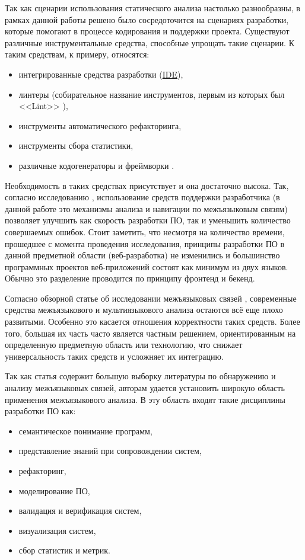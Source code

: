 Так как сценарии использования статического анализа настолько разнообразны, в рамках данной работы
решено было сосредоточится на сценариях разработки, которые помогают в процессе кодирования и поддержки проекта.
Существуют различные инструментальные средства, способные упрощать такие сценарии.
К таким средствам, к примеру, относятся:
\begin{itemize}
    \item интегрированные средства разработки (\hyperlink{IDE}{IDE}),
    \item линтеры (собирательное название инструментов, первым из которых был <<Lint>> \cite{linter}),
    \item инструменты автоматического рефакторинга,
    \item инструменты сбора статистики,
    \item различные кодогенераторы и фреймворки \cite{qt-moc}\cite{react}.
\end{itemize}

Необходимость в таких средствах присутствует и она достаточно высока. Так, согласно
исследованию \cite{aid-developers}, использование средств поддержки разработчика
(в данной работе это механизмы анализа и навигации по межъязыковым связям) позволяет
улучшить как скорость разработки ПО, так и уменьшить количество совершаемых ошибок. Стоит заметить,
что несмотря на количество времени, прошедшее с момента проведения исследования, 
принципы разработки ПО в данной предметной области (веб-разработка) не изменились и большинство
программных проектов веб-приложений состоят как минимум из двух языков. 
Обычно это разделение проводится по принципу фронтенд и бекенд.

Согласно обзорной статье об исследовании межъязыковых связей \cite{pragmatic-evidence}, современные средства межъязыкового
и мультиязыкового анализа остаются всё еще плохо развитыми. Особенно это касается отношения корректности
таких средств. Более того, большая их часть часто является частным решением, ориентированным на определенную
предметную область или технологию, что снижает универсальность таких средств и усложняет их интеграцию.

Так как статья содержит большую выборку литературы по обнаружению и анализу межъязыковых связей, авторам удается
установить широкую область применения межъязыкового анализа. В эту область входят такие дисциплины разработки ПО как:
\begin{itemize}
    \item семантическое понимание программ,
    \item представление знаний при сопровождении систем,
    \item рефакторинг,
    \item моделирование ПО,
    \item валидация и верификация систем,
    \item визуализация систем,
    \item сбор статистик и метрик.
\end{itemize}

